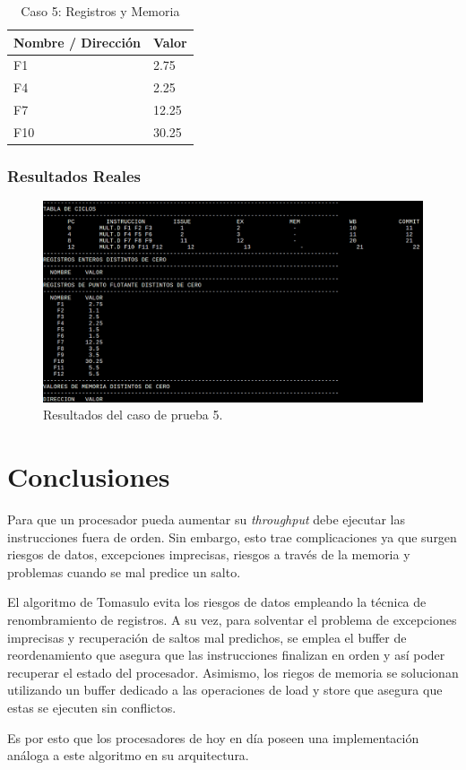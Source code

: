 \documentclass[a4paper]{article}
\begin{document}
	\begin{table}[H]
		\centering
		\caption*{Caso 5: Registros y Memoria}
		\begin{tabular}{|l|l|}
			\hline
			\textbf{Nombre / Dirección} & \textbf{Valor} \\ \hline
			F1                          & 2.75           \\ \hline
			F4                          & 2.25           \\ \hline
			F7                          & 12.25          \\ \hline
			F10                         & 30.25          \\ \hline
		\end{tabular}
	\end{table}

	\subsubsection*{Resultados Reales}

\begin{figure}[H]
	\centering
	\includegraphics[width=1\textwidth]{figures/test5.png}
	\caption{\label{fig:bloques}Resultados del caso de prueba 5.}
	\end{figure}


	\section{Conclusiones}
	
	Para que un procesador pueda aumentar su \textit{throughput} debe ejecutar las instrucciones fuera de orden. Sin embargo, esto trae complicaciones ya que surgen riesgos de datos, excepciones imprecisas, riesgos a través de la memoria y problemas cuando se mal predice un salto.
	
	El algoritmo de Tomasulo evita los riesgos de datos empleando la técnica de renombramiento de registros. A su vez, para solventar el problema de excepciones imprecisas y recuperación de saltos mal predichos, se emplea el buffer de reordenamiento que asegura que las instrucciones finalizan en orden y así poder recuperar el estado del procesador.	Asimismo, los riegos de memoria se solucionan utilizando un buffer dedicado a las operaciones de load y store que asegura que estas se ejecuten sin conflictos. 

	Es por esto que los procesadores de hoy en día poseen una implementación análoga a este algoritmo en su arquitectura. 

	
\end{document}
